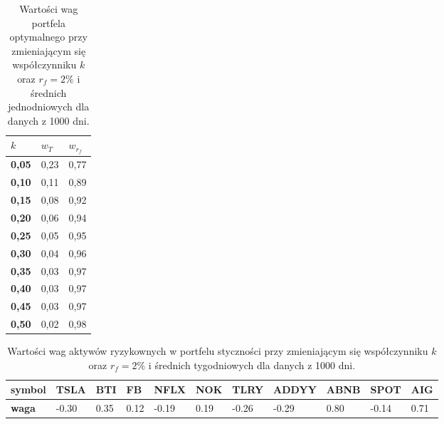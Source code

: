 \documentclass[magister]{dyplom}
\begin{document}
\begin{table}[ht]
	\centering
	\caption{Wartości wag portfela optymalnego przy zmieniającym się współczynniku $k$ oraz $r_f = 2\%$ i średnich jednodniowych dla danych z 1000 dni.}
	\begin{tabular}{|l|l|l|}
		\hline
		\textbf{$k$} & \textbf{$w_T$} & \textbf{$w_{r_f}$} \\ \hline
		\textbf{0,05}                                             & 0,23          & 0,77           \\ \hline
		\textbf{0,10}                                             & 0,11          & 0,89           \\ \hline
		\textbf{0,15}                                             & 0,08          & 0,92           \\ \hline
		\textbf{0,20}                                             & 0,06          & 0,94           \\ \hline
		\textbf{0,25}                                             & 0,05          & 0,95           \\ \hline
		\textbf{0,30}                                             & 0,04          & 0,96           \\ \hline
		\textbf{0,35}                                             & 0,03          & 0,97           \\ \hline
		\textbf{0,40}                                             & 0,03          & 0,97           \\ \hline
		\textbf{0,45}                                             & 0,03          & 0,97           \\ \hline
		\textbf{0,50}                                             & 0,02          & 0,98           \\ \hline
	\end{tabular}
\end{table}
\begin{table}[ht]
	\centering
	\caption{Wartości wag aktywów ryzykownych w portfelu styczności przy zmieniającym się współczynniku $k$ oraz $r_f = 2\%$ i średnich tygodniowych dla danych z 1000 dni.}
	\begin{tabular}{|l|l|l|l|l|l|l|l|l|l|l|}
		\hline
		\textbf{symbol} & \textbf{TSLA} & \textbf{BTI} & \textbf{FB} & \textbf{NFLX} & \textbf{NOK} & \textbf{TLRY} & \textbf{ADDYY} & \textbf{ABNB} & \textbf{SPOT} & \textbf{AIG} \\ \hline
		\textbf{waga}   & -0.30       & 0.35          & 0.12           & -0.19        & 0.19         & -0.26         & -0.29        & 0.80          & -0.14          & 0.71        \\ \hline
	\end{tabular}
\end{table}
\end{document}
